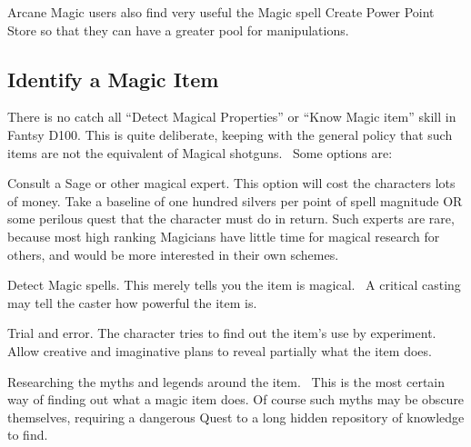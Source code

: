 Arcane Magic users also find very useful the Magic spell Create Power Point Store so that they can have a greater pool for manipulations.

\subsection{Identify a Magic Item}
There is no catch all “Detect Magical Properties” or “Know Magic item” skill in Fantsy D100. This is quite deliberate, keeping with the general policy that such items are not the equivalent of Magical shotguns.  Some options are:

Consult a Sage or other magical expert. This option will cost the characters lots of money. Take a baseline of one hundred silvers per point of spell magnitude OR some perilous quest that the character must do in return. Such experts are rare, because most high ranking Magicians have little time for magical research for others, and would be more interested in their own schemes. 

Detect Magic spells. This merely tells you the item is magical.  A critical casting may tell the caster how powerful the item is.

Trial and error. The character tries to find out the item’s use by experiment. Allow creative and imaginative plans to reveal partially what the item does.

Researching the myths and legends around the item.  This is the most certain way of finding out what a magic item does. Of course such myths may be obscure themselves, requiring a dangerous Quest to a long hidden repository of knowledge to find.

